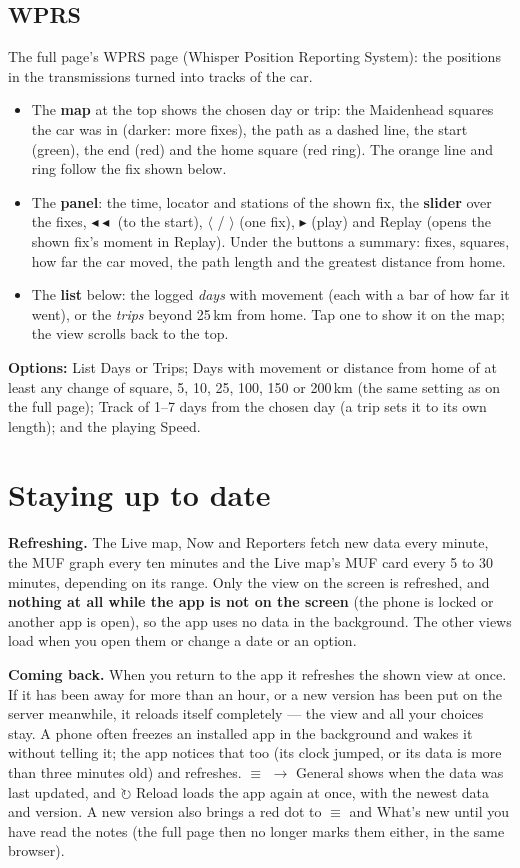 \documentclass[10pt,a4paper]{article}
\newcommand{\ui}[1]{\textsf{\small #1}}            %
\newcommand{\lead}[1]{\textbf{#1}\enspace}           %
\begin{document}
\subsection{WPRS}\label{sec:wprs}
The full page's WPRS page (Whisper Position Reporting System): the positions in the transmissions turned into tracks of the car.
\begin{itemize}[leftmargin=1.2em]
\item The \textbf{map} at the top shows the chosen day or trip: the Maidenhead squares the car was in (darker: more fixes), the path as a dashed line, the start (green), the end (red) and the home square (red ring). The orange line and ring follow the fix shown below.
\item The \textbf{panel}: the time, locator and stations of the shown fix, the \textbf{slider} over the fixes, \ui{$\blacktriangleleft\blacktriangleleft$} (to the start), \ui{$\langle$} / \ui{$\rangle$} (one fix), \ui{$\blacktriangleright$} (play) and \ui{Replay} (opens the shown fix's moment in Replay). Under the buttons a summary: fixes, squares, how far the car moved, the path length and the greatest distance from home.
\item The \textbf{list} below: the logged \emph{days} with movement (each with a bar of how far it went), or the \emph{trips} beyond 25\,km from home. Tap one to show it on the map; the view scrolls back to the top.
\end{itemize}
\textbf{Options:} \ui{List} Days or Trips; \ui{Days with movement or distance from home of at least} any change of square, 5, 10, 25, 100, 150 or 200\,km (the same setting as on the full page); \ui{Track of} 1--7 days from the chosen day (a trip sets it to its own length); and the playing \ui{Speed}.

\section{Staying up to date}\label{sec:fresh}
\lead{Refreshing.} The Live map, Now and Reporters fetch new data every minute, the MUF graph every ten minutes and the Live map's MUF card every 5 to 30 minutes, depending on its range. Only the view on the screen is refreshed, and \textbf{nothing at all while the app is not on the screen} (the phone is locked or another app is open), so the app uses no data in the background. The other views load when you open them or change a date or an option.

\lead{Coming back.} When you return to the app it refreshes the shown view at once. If it has been away for more than an hour, or a new version has been put on the server meanwhile, it reloads itself completely --- the view and all your choices stay. A phone often freezes an installed app in the background and wakes it without telling it; the app notices that too (its clock jumped, or its data is more than three minutes old) and refreshes. \ui{$\equiv$} $\rightarrow$ \ui{General} shows when the data was last updated, and \ui{$\circlearrowright$ Reload} loads the app again at once, with the newest data and version. A new version also brings a red dot to \ui{$\equiv$} and \ui{What's new} until you have read the notes (the full page then no longer marks them either, in the same browser).
\end{document}
